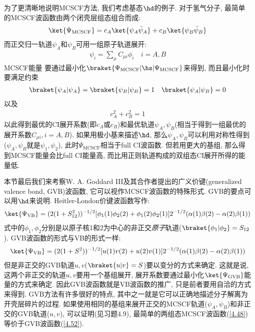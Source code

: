 为了更清晰地说明MCSCF方法, 
我们考虑基态$\hd$的例子. 
对于氢气分子, 
最简单的MCSCF波函数由两个闭壳层组态组合而成:
\begin{align}\label{4.48}
\ket{\Psi_\mathrm{MCSCF}} = c_A\ket{\psi_A\bar{\psi}_A} + c_B\ket{\psi_B\bar{\psi}_B} 
\end{align}
而正交归一轨道$\psi_A$和$\psi_B$可用一组原子轨道展开:
\begin{align}
\psi_i=\sum_\mu C_{\mu i}\phi_i\quad i=A,B
\end{align}
MCSCF能量 要通过最小化$\braket{\Psi_\mathrm{MCSCF}|\hs|\Psi_\mathrm{MCSCF}}$来得到, 而且最小化时要满足约束
\begin{align}
\braket{\psi_A|\psi_A} = \braket{\psi_B|\psi_B}=1\quad \braket{\psi_A|\psi_B}=0
\end{align}
以及
\begin{align}
c_A^2 + c_B^2 = 1
\end{align}
以此得到最优的CI展开系数(即$c_A$或$c_B$)和最优轨道$\psi_A,\psi_B$(相当于得到一组最优的展开系数$C_{\mu i}, i=A,B$). 
如果用极小基来描述$\hd$, 
那么$\psi_A,\psi_B$可以利用对称性得到($\psi_A,\psi_B$就是$\psi_1,\psi_2$), 
此时$\Psi_\mathrm{MCSCF}$相当于full CI波函数. 
但若用更大的基组, 
那么得到MCSCF能量会比full CI能量高, 
而比用\hft 正则轨道构成的双组态CI展开所得的能量低.


本节最后我们来考察W. A. Goddard III及其合作者提出的广义价键(generalized valence bond, 
GVB)波函数, 
它可以视作MCSCF波函数的特殊形式. 
GVB的要点可以用$\hd$来说明. 
Heitler-London价键波函数写作:
\begin{align}
\ket{\Psi_\mathrm{VB}} = (2(1+S_{12}^2))^{-1/2} [\phi_1(1)\phi_2(2) + \phi_1(2)\phi_2(1)]2^{-1/2}(\alpha(1)\beta(2)-\alpha(2)\beta(1))
\end{align}
式中的$\phi_1,\phi_2$分别是以原子核1和2为中心的非正交\emph{原子}轨道($\braket{\phi_1|\phi_2}=S_{12}$). 
GVB波函数的形式与VB的形式一样:
\begin{align}\label{4.52}
	\ket{\Psi_\mathrm{VB}} = (2(1+S^2))^{-1/2} [u(1)v(2) + u(2)v(1)]2^{-1/2}(\alpha(1)\beta(2)-\alpha(2)\beta(1))
\end{align}
但是非正交的GVB轨道$u,v$($\braket{u|v}=S$)要以变分的方式来确定. 
这就是说, 
这两个非正交的轨道$u,v$要用一个基组展开, 
展开系数要通过最小化$\ket{\Psi_\mathrm{GVB}}$能量的方式来确定. 
因此GVB波函数就是VB波函数的推广, 
只是前者要用自洽的方式来得到. 
GVB方法有许多很好的特点, 
其中之一就是它可以正确地描述分子解离为开壳层碎片的过程. 
如果使用相同的基组来展开正交的MCSCF轨道($\psi_A,\psi_B$)和非正交的GVB轨道($u,v$), 
可以证明(见习题4.9), 
最简单的两组态MCSCF波函数(\autoref{4.48})等价于GVB波函数(\autoref{4.52}).


